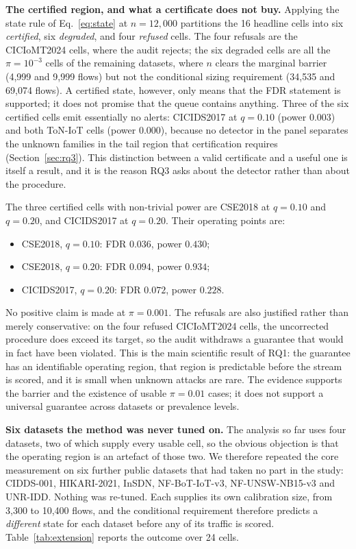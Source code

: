 \documentclass[a4paper,fleqn]{cas-dc}
\begin{document}
\textbf{The certified region, and what a certificate does not buy.} Applying the state rule of Eq.~\eqref{eq:state} at $n=12{,}000$ partitions the 16 headline cells into six \emph{certified}, six \emph{degraded}, and four \emph{refused} cells. The four refusals are the CICIoMT2024 cells, where the audit rejects; the six degraded cells are all the $\pi=10^{-3}$ cells of the remaining datasets, where $n$ clears the marginal barrier (4{,}999 and 9{,}999 flows) but not the conditional sizing requirement (34{,}535 and 69{,}074 flows). A certified state, however, only means that the FDR statement is supported; it does not promise that the queue contains anything. Three of the six certified cells emit essentially no alerts: CICIDS2017 at $q=0.10$ (power 0.003) and both ToN-IoT cells (power 0.000), because no detector in the panel separates the unknown families in the tail region that certification requires (Section~\ref{sec:rq3}). This distinction between a valid certificate and a useful one is itself a result, and it is the reason RQ3 asks about the detector rather than about the procedure.

The three certified cells with non-trivial power are CSE2018 at $q=0.10$ and $q=0.20$, and CICIDS2017 at $q=0.20$. Their operating points are:
\begin{itemize}
  \item CSE2018, $q=0.10$: FDR $0.036$, power $0.430$;
  \item CSE2018, $q=0.20$: FDR $0.094$, power $0.934$;
  \item CICIDS2017, $q=0.20$: FDR $0.072$, power $0.228$.
\end{itemize}
No positive claim is made at $\pi=0.001$. The refusals are also justified rather than merely conservative: on the four refused CICIoMT2024 cells, the uncorrected procedure does exceed its target, so the audit withdraws a guarantee that would in fact have been violated. This is the main scientific result of RQ1: the guarantee has an identifiable operating region, that region is predictable before the stream is scored, and it is small when unknown attacks are rare. The evidence supports the barrier and the existence of usable $\pi=0.01$ cases; it does not support a universal guarantee across datasets or prevalence levels.

\textbf{Six datasets the method was never tuned on.} The analysis so far uses four datasets, two of which supply every usable cell, so the obvious objection is that the operating region is an artefact of those two. We therefore repeated the core measurement on six further public datasets that had taken no part in the study: CIDDS-001, HIKARI-2021, InSDN, NF-BoT-IoT-v3, NF-UNSW-NB15-v3 and UNR-IDD. Nothing was re-tuned. Each supplies its own calibration size, from 3{,}300 to 10{,}400 flows, and the conditional requirement therefore predicts a \emph{different} state for each dataset before any of its traffic is scored. Table~\ref{tab:extension} reports the outcome over 24 cells.
\end{document}
